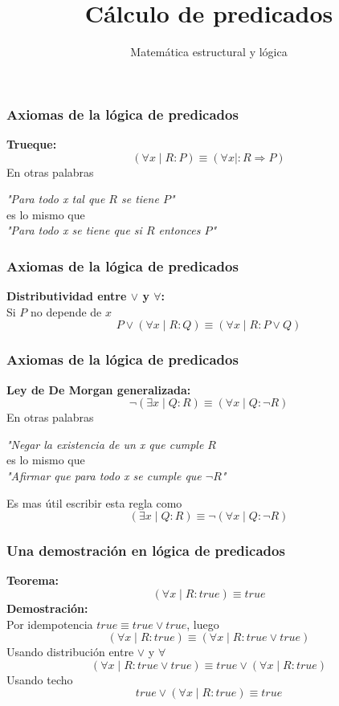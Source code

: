 \documentclass{beamer}
\title{Cálculo de predicados}
\author{Matemática estructural y lógica}
\institute{ISIS-1104}
\date{}
\newcommand{\then}{\Rightarrow}
\begin{document}
\frame{\titlepage}

\begin{frame}[fragile]
    \frametitle{Axiomas de la lógica de predicados}
    \textbf{Trueque:}
    $$(\forall x \mid R : P) \equiv (\forall x \mid : R \then P)$$
    En otras palabras
    \begin{center}
        \textit{"Para todo x tal que $R$ se tiene $P$"} \\
        es lo mismo que \\
        \textit{"Para todo x se tiene que si $R$ entonces $P$"}
    \end{center}
\end{frame}

\begin{frame}[fragile]
    \frametitle{Axiomas de la lógica de predicados}
    \textbf{Distributividad entre $\lor$ y $\forall$:} \\
    Si $P$ no depende de $x$
    $$P \lor (\forall x \mid R : Q) \equiv (\forall x \mid R : P \lor Q)$$
\end{frame}

\begin{frame}[fragile]
    \frametitle{Axiomas de la lógica de predicados}
    \textbf{Ley de De Morgan generalizada:} \\
    $$\lnot (\exists x \mid Q : R) \equiv (\forall x \mid Q : \lnot R)$$
    En otras palabras
    \begin{center}
        \textit{"Negar la existencia de un x que cumple $R$} \\
        es lo mismo que \\
        \textit{"Afirmar que para todo x se cumple que $\lnot R$"}
    \end{center}
    Es mas útil escribir esta regla como
    $$(\exists x \mid Q : R) \equiv \lnot (\forall x \mid Q : \lnot R)$$
\end{frame}

\begin{frame}[fragile]
    \frametitle{Una demostración en lógica de predicados}
    \textbf{Teorema:}
    $$(\forall x \mid R : true) \equiv true$$
    \textbf{Demostración:} \\
    Por idempotencia $true \equiv true \lor true$, luego
    $$(\forall x \mid R : true) \equiv (\forall x \mid R : true \lor true)$$
    Usando distribución entre $\lor$ y $\forall$
    $$(\forall x \mid R : true \lor true) \equiv true \lor (\forall x \mid R : true)$$
    Usando techo
    $$true \lor (\forall x \mid R : true) \equiv true$$
\end{frame}
\end{document}

